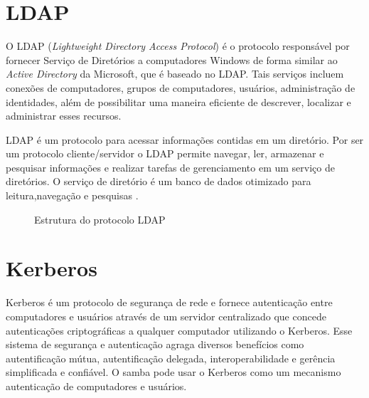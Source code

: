 \section{LDAP}

O LDAP (\textit{Lightweight Directory Access Protocol}) é o protocolo responsável por fornecer Serviço de Diretórios a computadores Windows de forma similar ao \textit{Active Directory} da Microsoft, que é baseado no LDAP. Tais serviços incluem conexões de computadores, grupos de computadores, usuários, administração de identidades, além de possibilitar uma maneira eficiente de descrever, localizar e administrar esses recursos.

LDAP é um protocolo para acessar informações contidas em um diretório. Por ser um protocolo cliente/servidor o LDAP permite navegar, ler, armazenar e pesquisar informações e realizar tarefas de gerenciamento em um serviço de diretórios. O serviço de diretório é um banco de dados otimizado para leitura,navegação e pesquisas \cite{TRIGO}.

\begin{figure}[ht]
   	\centering
   	\caption{Estrutura do protocolo LDAP \cite{LDAP}}
    \label{ldap}
\end{figure}

\section{Kerberos}

Kerberos é um protocolo de segurança de rede e fornece autenticação entre computadores e usuários através de um servidor centralizado que concede autenticações criptográficas a qualquer computador utilizando o Kerberos. Esse sistema de segurança e autenticação agraga diversos benefícios como autentificação mútua, autentificação delegada, interoperabilidade e gerência simplificada e confiável. O samba pode usar o Kerberos como um mecanismo autenticação de computadores e usuários.

